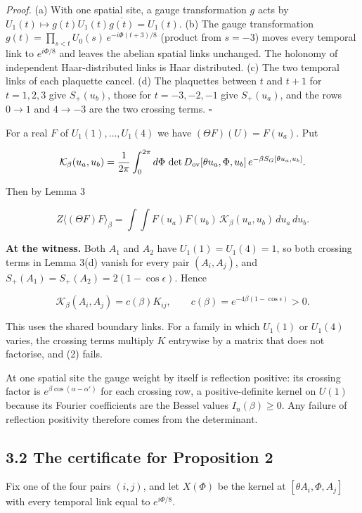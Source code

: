 \documentclass[11pt,a4paper]{article}
\begin{document}
\emph{Proof.} (a) With one spatial site, a gauge transformation $g$ acts by $U_1(t)\mapsto g(t)U_1(t)\overline{g(t)}=U_1(t)$. (b) The gauge transformation $g(t)=\prod_{s<t}U_0(s)\,e^{-i\Phi(t+3)/8}$ (product from $s=-3$) moves every temporal link to $e^{i\Phi/8}$ and leaves the abelian spatial links unchanged. The holonomy of independent Haar-distributed links is Haar distributed. (c) The two temporal links of each plaquette cancel. (d) The plaquettes between $t$ and $t+1$ for $t=1,2,3$ give $S_+(u_b)$, those for $t=-3,-2,-1$ give $S_+(u_a)$, and the rows $0\to1$ and $4\to-3$ are the two crossing terms. $\square$

For a real $F$ of $U_1(1),\dots,U_1(4)$ we have $(\Theta F)(U)=F(u_a)$. Put


\begin{equation*}
\mathcal K_\beta(u_a,u_b)=\frac1{2\pi}\int_0^{2\pi}d\Phi\,\det D_{\rm ov}[\theta u_a,\Phi,u_b]\,e^{-\beta S_G[\theta u_a,u_b]}.
\end{equation*}


Then by Lemma 3


\begin{equation*}
Z\langle(\Theta F)F\rangle_\beta=\int\!\!\int F(u_a)F(u_b)\,\mathcal K_\beta(u_a,u_b)\,du_a\,du_b. \tag{1}
\end{equation*}


{\bfseries\boldmath At the witness.} Both $A_1$ and $A_2$ have $U_1(1)=U_1(4)=1$, so both crossing terms in Lemma 3(d) vanish for every pair $(A_i,A_j)$, and $S_+(A_1)=S_+(A_2)=2(1-\cos\epsilon)$. Hence


\begin{equation*}
\mathcal K_\beta(A_i,A_j)=c(\beta)K_{ij},\qquad c(\beta)=e^{-4\beta(1-\cos\epsilon)}>0. \tag{2}
\end{equation*}


This uses the shared boundary links. For a family in which $U_1(1)$ or $U_1(4)$ varies, the crossing terms multiply $K$ entrywise by a matrix that does not factorise, and (2) fails.

At one spatial site the gauge weight by itself is reflection positive: its crossing factor is $e^{\beta\cos(\alpha-\alpha')}$ for each crossing row, a positive-definite kernel on $U(1)$ because its Fourier coefficients are the Bessel values $I_n(\beta)\ge0$. Any failure of reflection positivity therefore comes from the determinant.


\subsection*{3.2 The certificate for Proposition 2}
Fix one of the four pairs $(i,j)$, and let $X(\Phi)$ be the kernel at $[\theta A_i,\Phi,A_j]$ with every temporal link equal to $e^{i\Phi/8}$.
\end{document}
